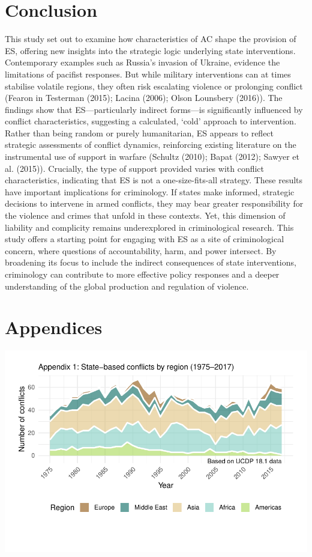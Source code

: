 \documentclass[
]{article}
\begin{document}
\section{Conclusion}\label{conclusion}

This study set out to examine how characteristics of AC shape the
provision of ES, offering new insights into the strategic logic
underlying state interventions. Contemporary examples such as Russia's
invasion of Ukraine, evidence the limitations of pacifist responses. But
while military interventions can at times stabilise volatile regions,
they often risk escalating violence or prolonging conflict (Fearon in
Testerman (2015); Lacina (2006); Olson Lounsbery (2016)). The findings
show that ES---particularly indirect forms---is significantly influenced
by conflict characteristics, suggesting a calculated, `cold' approach to
intervention. Rather than being random or purely humanitarian, ES
appears to reflect strategic assessments of conflict dynamics,
reinforcing existing literature on the instrumental use of support in
warfare (Schultz (2010); Bapat (2012); Sawyer et al. (2015)). Crucially,
the type of support provided varies with conflict characteristics,
indicating that ES is not a one-size-fits-all strategy. These results
have important implications for criminology. If states make informed,
strategic decisions to intervene in armed conflicts, they may bear
greater responsibility for the violence and crimes that unfold in these
contexts. Yet, this dimension of liability and complicity remains
underexplored in criminological research. This study offers a starting
point for engaging with ES as a site of criminological concern, where
questions of accountability, harm, and power intersect. By broadening
its focus to include the indirect consequences of state interventions,
criminology can contribute to more effective policy responses and a
deeper understanding of the global production and regulation of
violence.

\section{Appendices}\label{appendices}

\includegraphics{Dissertation_writeup_files/figure-latex/Region (Appendix 1)-1.pdf}
\end{document}
